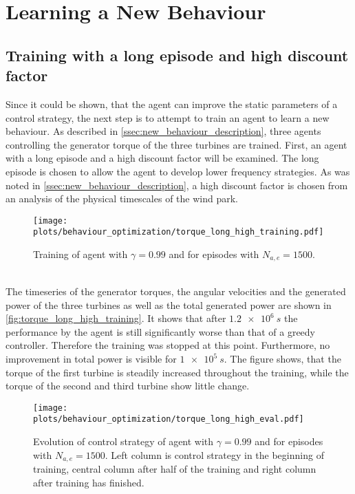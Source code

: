 \section{Learning a New Behaviour}
\subsection{Training with a long episode and high discount factor}
Since it could be shown, that the agent can improve the static parameters of a control strategy, the next step is to attempt to train an agent to learn a new behaviour. As described in \ref{ssec:new_behaviour_description}, three agents controlling the generator torque of the three turbines are trained. First, an agent with a long episode and a high discount factor will be examined. The long episode is chosen to allow the agent to develop lower frequency strategies. As was noted in \autoref{ssec:new_behaviour_description}, a high discount factor is chosen from an analysis of the physical timescales of the wind park.
\begin{figure}[h]
	\texttt{[image: plots/behaviour\_optimization/torque\_long\_high\_training.pdf]}
	\caption{ Training of agent with $\gamma=0.99$ and for episodes with $N_{a,e}=1500$.}
	\label{fig:torque_long_high_training}
\end{figure}\\
The timeseries of the generator torques, the angular velocities and the generated power of the three turbines as well as the total generated power are shown in \autoref{fig:torque_long_high_training}. It shows that after $\SI{1.2e6}{s}$ the performance by the agent is still significantly worse than that of a greedy controller. Therefore the training was stopped at this point. Furthermore, no improvement in total power is visible for $\SI{1e5}{s}$. The figure shows, that the torque of the first turbine is steadily increased throughout the training, while the torque of the second and third turbine show little change.
\begin{figure}[h]
	\texttt{[image: plots/behaviour\_optimization/torque\_long\_high\_eval.pdf]}
	\caption{Evolution of control strategy of agent with $\gamma=0.99$ and for episodes with $N_{a,e}=1500$. Left column is control strategy in the beginning of training, central column after half of the training and right column after training has finished.}
	\label{fig:torque_long_high_eval}
\end{figure} \\
